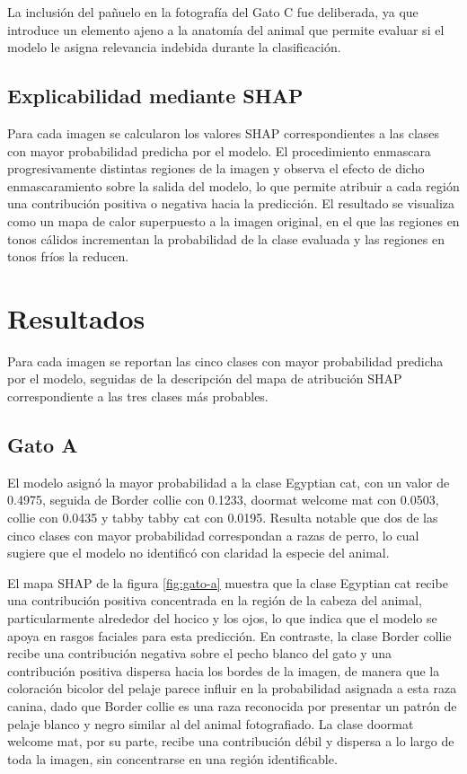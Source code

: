 \documentclass[11pt]{article}
\begin{document}
La inclusión del pañuelo en la fotografía del Gato C fue deliberada, ya que introduce un elemento ajeno a la anatomía del animal que permite evaluar si el modelo le asigna relevancia indebida durante la clasificación.

\subsection{Explicabilidad mediante SHAP}

Para cada imagen se calcularon los valores SHAP correspondientes a las clases con mayor probabilidad predicha por el modelo. El procedimiento enmascara progresivamente distintas regiones de la imagen y observa el efecto de dicho enmascaramiento sobre la salida del modelo, lo que permite atribuir a cada región una contribución positiva o negativa hacia la predicción. El resultado se visualiza como un mapa de calor superpuesto a la imagen original, en el que las regiones en tonos cálidos incrementan la probabilidad de la clase evaluada y las regiones en tonos fríos la reducen.

\section{Resultados}

Para cada imagen se reportan las cinco clases con mayor probabilidad predicha por el modelo, seguidas de la descripción del mapa de atribución SHAP correspondiente a las tres clases más probables.

\subsection{Gato A}

El modelo asignó la mayor probabilidad a la clase Egyptian cat, con un valor de 0.4975, seguida de Border collie con 0.1233, doormat welcome mat con 0.0503, collie con 0.0435 y tabby tabby cat con 0.0195. Resulta notable que dos de las cinco clases con mayor probabilidad correspondan a razas de perro, lo cual sugiere que el modelo no identificó con claridad la especie del animal.

El mapa SHAP de la figura \ref{fig:gato-a} muestra que la clase Egyptian cat recibe una contribución positiva concentrada en la región de la cabeza del animal, particularmente alrededor del hocico y los ojos, lo que indica que el modelo se apoya en rasgos faciales para esta predicción. En contraste, la clase Border collie recibe una contribución negativa sobre el pecho blanco del gato y una contribución positiva dispersa hacia los bordes de la imagen, de manera que la coloración bicolor del pelaje parece influir en la probabilidad asignada a esta raza canina, dado que Border collie es una raza reconocida por presentar un patrón de pelaje blanco y negro similar al del animal fotografiado. La clase doormat welcome mat, por su parte, recibe una contribución débil y dispersa a lo largo de toda la imagen, sin concentrarse en una región identificable.
\end{document}
